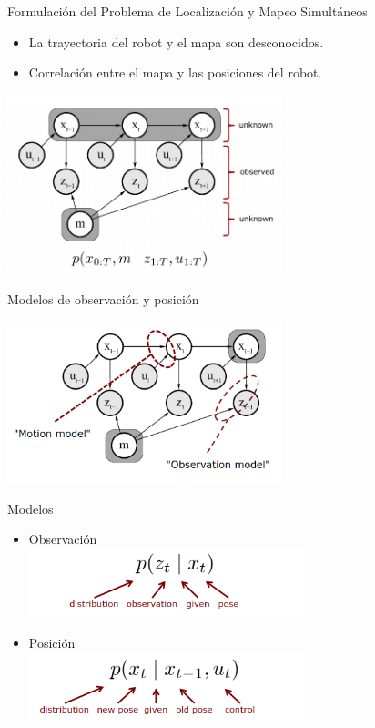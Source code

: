 \documentclass[
  24pt, %
  aspectratio=169, %
]{beamer}
\begin{document}
\begin{frame}{Formulación del Problema de Localización y Mapeo Simultáneos}

  \begin{itemize}
  \item La trayectoria del robot y el mapa son desconocidos.
  \item Correlación entre el mapa y las posiciones del robot. 
  \end{itemize}

  \centering

  \includegraphics[width=8cm]{slam2}

\end{frame}

\begin{frame}{Modelos de observación y posición}

  \centering

  \includegraphics[width=8cm]{slam3}

\end{frame}

\begin{frame}{Modelos}

  \centering

  \begin{itemize}
  \item Observación\\
    \includegraphics[width=8cm]{slam5}  
  \item Posición\\
    \includegraphics[width=8cm]{slam4}  
  \end{itemize}  
\end{frame}
\end{document}
